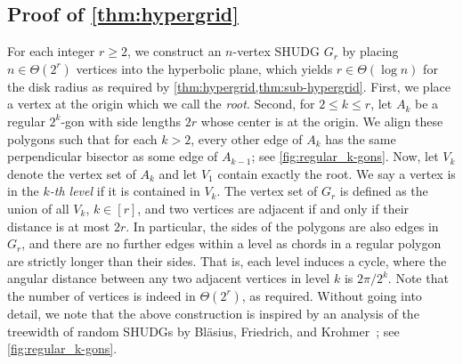 \documentclass[a4paper,english,cleveref,thm-restate]{lipics-v2021}
\begin{document}

\subsection{Proof of \texorpdfstring{\cref{thm:hypergrid}}{Theorem 8}}
\label{sec:lower_bound_tw_logn}


For each integer $ r \geq 2 $, we construct an $n$-vertex SHUDG $G_r$ by placing $ n \in \Theta(2^r) $ vertices into the hyperbolic plane, which yields $ r \in \Theta(\log n) $ for the disk radius as required by \cref{thm:hypergrid,thm:sub-hypergrid}.
First, we place a vertex at the origin which we call the \emph{root}.
Second, for $ 2 \leq k \leq r $, let $ A_k $ be a regular $ 2^k $-gon with side lengths $ 2r $ whose center is at the origin.
We align these polygons such that for each $ k > 2 $, every other edge of $ A_k $ has the same perpendicular bisector as some edge of $ A_{k-1} $; see \cref{fig:regular_k-gons}.
Now, let $ V_k $ denote the vertex set of $ A_k $ and let $ V_1 $ contain exactly the root.
We say a vertex is in the \emph{$k$-th level} if it is contained in $ V_k $.
The vertex set of $ G_r $ is defined as the union of all $ V_k $, $ k \in [r] $, and two vertices are adjacent if and only if their distance is at most $ 2r $.
In particular, the sides of the polygons are also edges in $ G_r $, and there are no further edges within a level as chords in a regular polygon are strictly longer than their sides.
That is, each level induces a cycle, where the angular distance between any two adjacent vertices in level $ k $ is $ 2 \pi / 2^k $.
Note that the number of vertices is indeed in $ \Theta(2^r) $, as required.
%
Without going into detail, we note that the above construction is inspired by an analysis of the treewidth of random SHUDGs by Bläsius, Friedrich, and Krohmer~\cite{blasius_hyperbolic_2016}; see \cref{fig:regular_k-gons}.
\end{document}
